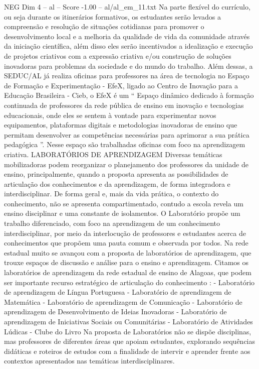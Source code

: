 \begin{textsample}{NEG Dim 4 – al – Score -1.00 – al/al\_em\_11.txt}
Na parte flexível do currículo, ou seja durante os itinerários formativos, os estudantes serão levados a compreensão e resolução de situações cotidianas para promover o desenvolvimento local e a melhoria da qualidade de vida da comunidade através da iniciação científica, além disso eles serão incentivados a idealização e execução de projetos criativos com a expressão criativa e/ou construção de soluções inovadoras para problemas da sociedade e do mundo do trabalho.
Além dessas, a SEDUC/AL já realiza oficinas para professores na área de tecnologia no Espaço de Formação e Experimentação - EfeX, ligado ao Centro de Inovação para a Educação Brasileira - Cieb, o EfeX é um “ Espaço dinâmico dedicado à formação continuada de professores da rede pública de ensino em inovação e tecnologias educacionais, onde eles se sentem à vontade para experimentar novos equipamentos, plataformas digitais e metodologias inovadoras de ensino que permitam desenvolver as competências necessárias para aprimorar a sua prática pedagógica ”.
Nesse espaço são trabalhadas oficinas com foco na aprendizagem criativa.
LABORATÓRIOS DE APRENDIZAGEM Diversas temáticas mobilizadoras podem reorganizar o planejamento dos professores da unidade de ensino, principalmente, quando a proposta apresenta as possibilidades de articulação dos conhecimentos e da aprendizagem, de forma integradora e interdisciplinar.
De forma geral e, mais da vida prática, o contexto do conhecimento, não se apresenta compartimentado, contudo a escola revela um ensino disciplinar e uma constante de isolamentos.
O Laboratório propõe um trabalho diferenciado, com foco na aprendizagem de um conhecimento interdisciplinar, por meio da interlocução de professores e estudantes acerca de conhecimentos que propõem uma pauta comum e observada por todos.
Na rede estadual muito se avançou com a proposta de laboratórios de aprendizagem, que trouxe espaços de discussão e análise para o ensino e aprendizagem.
Citamos os laboratórios de aprendizagem da rede estadual de ensino de Alagoas, que podem ser importante recurso estratégico de articulação do conhecimento : - Laboratório de aprendizagem de Língua Portuguesa - Laboratório de aprendizagem de Matemática - Laboratório de aprendizagem de Comunicação - Laboratório de aprendizagem de Desenvolvimento de Ideias Inovadoras - Laboratório de aprendizagem de Iniciativas Sociais ou Comunitárias - Laboratório de Atividades Lúdicas - Clube do Livro Na proposta de Laboratórios não se dispõe disciplinas, mas professores de diferentes áreas que apoiam estudantes, explorando sequências didáticas e roteiros de estudos com a finalidade de intervir e aprender frente aos contextos apresentados nas temáticas interdisciplinares.

\end{textsample}
